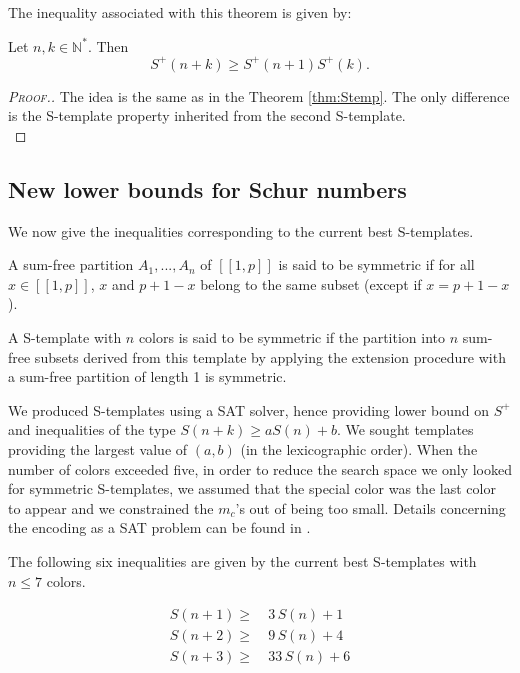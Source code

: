 	The inequality associated with this theorem is given by:
	
\begin{corollary}
	Let \(n, k \in \mathbb{N}^*\). Then
	\[ S^+(n+k) \geqslant S^+(n+1)S^+(k).\]
\end{corollary}

\begin{proof}[\textsc{Proof.}]
The idea is the same as in the Theorem \ref{thm:Stemp}. The only difference is the S-template property inherited 
from the second S-template. \\
\end{proof}


\subsection{New lower bounds for Schur numbers}
\label{subsec:lowS}

We now give the inequalities corresponding to the current  best S-templates.

\begin{definition}
A sum-free partition \(A_1, ..., A_n\) of \([\![1, p]\!]\) is said to be symmetric if for all \( x \in [\![1, p]\!]\), 
\(x\) and \(p + 1 - x\) belong to the same subset (except if \(x = p + 1 - x\)).

A S-template with \(n\) colors is said to be symmetric if the partition into \(n\) sum-free subsets derived 
from this template by applying the extension procedure with a sum-free partition of length 1 is symmetric. 
\end{definition}

We produced S-templates using a SAT solver, hence providing lower bound on \(S^+\) and inequalities 
of the type \(S(n+k) \geqslant a S(n) + b\). We sought templates providing the largest value of 
\((a, b)\) (in the lexicographic order). When the number of colors exceeded five, in order to reduce the search space we 
only looked for symmetric S-templates, we assumed that the special color was the last color to appear and we constrained 
the \(m_c\)'s out of being too small. Details concerning the encoding as a SAT problem can be found in \cite{Heule2017}.

\par
The following six inequalities are given by the current best S-templates with \(n \leqslant 7\) colors.

\begin{align}
	S(n + 1) \geqslant &~3\,S(n)  + 1 \label{S(n+1)}\\
	S(n + 2) \geqslant &~9\,S(n)  + 4 \label{S(n+2)}\\
	S(n + 3) \geqslant &~33\,S(n) + 6 \label{S(n+3)}
\end{align}

